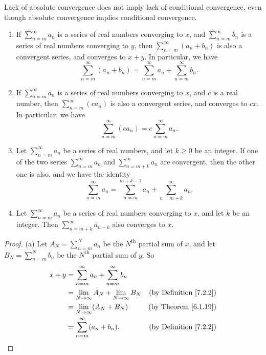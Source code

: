 \begin{note}
    Lack of absolute convergence does not imply lack of conditional convergence, even though absolute convergence implies conditional convergence.
\end{note}

\setcounter{theorem}{13}
\begin{proposition}\label{7.2.14}
    \mbox{}
    \begin{enumerate}
        \item If \(\sum_{n = m}^\infty a_n\) is a series of real numbers converging to \(x\), and \(\sum_{n = m}^\infty b_n\) is a series of real numbers converging to \(y\), then \(\sum_{n = m}^\infty (a_n + b_n)\) is also a convergent series, and converges to \(x + y\).
              In particular, we have
              \[
                  \sum_{n = m}^\infty (a_n + b_n) = \sum_{n = m}^\infty a_n + \sum_{n = m}^\infty b_n.
              \]
        \item If \(\sum_{n = m}^\infty a_n\) is a series of real numbers converging to \(x\), and \(c\) is a real number, then \(\sum_{n = m}^\infty (c a_n)\) is also a convergent series, and converges to \(cx\).
              In particular, we have
              \[
                  \sum_{n = m}^\infty (c a_n) = c \sum_{n = m}^\infty a_n.
              \]
        \item Let \(\sum_{n = m}^\infty a_n\) be a series of real numbers, and let \(k \geq 0\) be an integer.
              If one of the two series \(\sum_{n = m}^\infty a_n\) and \(\sum_{n = m + k}^\infty a_n\) are convergent, then the other one is also, and we have the identity
              \[
                  \sum_{n = m}^\infty a_n = \sum_{n = m}^{m + k - 1} a_n + \sum_{n = m + k}^\infty a_n.
              \]
        \item Let \(\sum_{n = m}^\infty a_n\) be a series of real numbers converging to \(x\), and let \(k\) be an integer.
              Then \(\sum_{n = m + k}^\infty a_{n - k}\) also converges to \(x\).
    \end{enumerate}
\end{proposition}

\begin{proof}{(a)}
    Let \(A_N = \sum_{n = m}^N a_n\) be the \(N^{\text{th}}\) partial sum of \(x\), and let \(B_N = \sum_{n = m}^N b_n\) be the \(N^{\text{th}}\) partial sum of \(y\).
    So
    \begin{align*}
        x + y & = \sum_{n = m}^\infty a_n + \sum_{n = m}^\infty b_n                                      \\
              & = \lim_{N \to \infty} A_N + \lim_{N \to \infty} B_N & \text{(by Definition \ref{7.2.2})} \\
              & = \lim_{N \to \infty} (A_N + B_N)                   & \text{(by Theorem \ref{6.1.19})}   \\
              & = \sum_{n = m}^\infty (a_n + b_n).                  & \text{(by Definition \ref{7.2.2})}
    \end{align*}
\end{proof}


